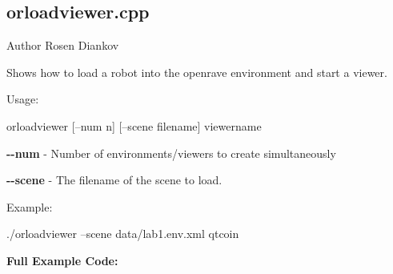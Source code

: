 \hypertarget{orloadviewer.cpp-example}{
\subsection{orloadviewer.cpp}
}
\begin{DoxyAuthor}{Author}
Rosen Diankov
\end{DoxyAuthor}
Shows how to load a robot into the openrave environment and start a viewer.

Usage: \begin{DoxyVerb}
    orloadviewer [--num n] [--scene filename] viewername
    \end{DoxyVerb}



\begin{DoxyItemize}
\item {\bfseries -\/-\/num} -\/ Number of environments/viewers to create simultaneously
\item {\bfseries -\/-\/scene} -\/ The filename of the scene to load.
\end{DoxyItemize}

Example: \begin{DoxyVerb}
    ./orloadviewer --scene data/lab1.env.xml qtcoin
    \end{DoxyVerb}


{\bfseries Full Example Code:}



